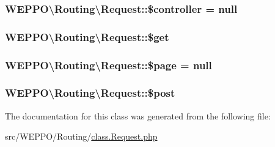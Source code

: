 \subsubsection[{\texorpdfstring{\$controller}{$controller}}]{\setlength{\rightskip}{0pt plus 5cm}W\+E\+P\+P\+O\textbackslash{}\+Routing\textbackslash{}\+Request\+::\$controller = null\hspace{0.3cm}{\ttfamily [protected]}}\hypertarget{classWEPPO_1_1Routing_1_1Request_ab9223d9d066899d7ecaba6555d4ebc84}{}\label{classWEPPO_1_1Routing_1_1Request_ab9223d9d066899d7ecaba6555d4ebc84}
\subsubsection[{\texorpdfstring{\$get}{$get}}]{\setlength{\rightskip}{0pt plus 5cm}W\+E\+P\+P\+O\textbackslash{}\+Routing\textbackslash{}\+Request\+::\$get\hspace{0.3cm}{\ttfamily [protected]}}\hypertarget{classWEPPO_1_1Routing_1_1Request_aaf91a35c7a1387692c95b4cb85be1160}{}\label{classWEPPO_1_1Routing_1_1Request_aaf91a35c7a1387692c95b4cb85be1160}
\subsubsection[{\texorpdfstring{\$page}{$page}}]{\setlength{\rightskip}{0pt plus 5cm}W\+E\+P\+P\+O\textbackslash{}\+Routing\textbackslash{}\+Request\+::\$page = null\hspace{0.3cm}{\ttfamily [protected]}}\hypertarget{classWEPPO_1_1Routing_1_1Request_a50d161576816d3da987670bc5254fc56}{}\label{classWEPPO_1_1Routing_1_1Request_a50d161576816d3da987670bc5254fc56}
\subsubsection[{\texorpdfstring{\$post}{$post}}]{\setlength{\rightskip}{0pt plus 5cm}W\+E\+P\+P\+O\textbackslash{}\+Routing\textbackslash{}\+Request\+::\$post\hspace{0.3cm}{\ttfamily [protected]}}\hypertarget{classWEPPO_1_1Routing_1_1Request_a7c220b935196945e34f837e8370c12d2}{}\label{classWEPPO_1_1Routing_1_1Request_a7c220b935196945e34f837e8370c12d2}


The documentation for this class was generated from the following file\+:\begin{DoxyCompactItemize}
\item 
src/\+W\+E\+P\+P\+O/\+Routing/\hyperlink{class_8Request_8php}{class.\+Request.\+php}\end{DoxyCompactItemize}
